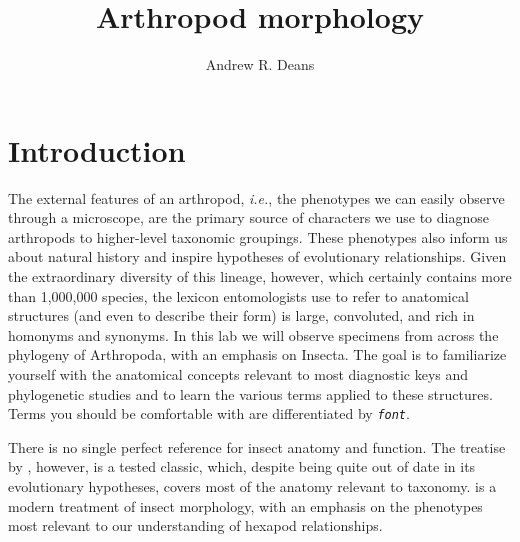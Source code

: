 \documentclass[letterpaper, 11pt]{article}
\title{Arthropod morphology}
\author{Andrew R. Deans}
\newcommand{\latinword}[1]{\texttt{\itshape #1}}%
\begin{document}
\cleanlookdateon %
\maketitle
\thispagestyle{fancy}
\section*{Introduction}
The external features of an arthropod, \textit{i.e.}, the phenotypes we can easily observe through a microscope, are the primary source of characters we use to diagnose arthropods to higher-level taxonomic groupings. These phenotypes also inform us about natural history and inspire hypotheses of evolutionary relationships. Given the extraordinary diversity of this lineage, however, which certainly contains more than 1,000,000 species, the lexicon entomologists use to refer to anatomical structures (and even to describe their form) is large, convoluted, and rich in homonyms and synonyms. In this lab we will observe specimens from across the phylogeny of Arthropoda, with an emphasis on Insecta. The goal is to familiarize yourself with the anatomical concepts relevant to most diagnostic keys and phylogenetic studies and to learn the various terms applied to these structures. Terms you should be comfortable with are differentiated by \latinword{font}.

There is no single perfect reference for insect anatomy and function. The treatise by \cite{snodgrass1935principles}, however, is a tested classic, which, despite being quite out of date in its evolutionary hypotheses, covers most of the anatomy relevant to taxonomy. \cite{beutel2013insect} is a modern treatment of insect morphology, with an emphasis on the phenotypes most relevant to our understanding of hexapod relationships.
\end{document}
